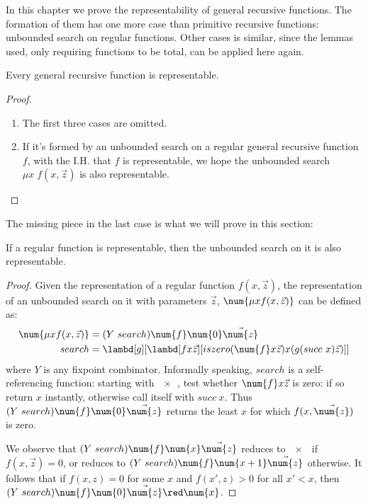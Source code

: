 \documentclass[../../../include/open-logic-section]{subfiles}
\begin{document}

In this chapter we prove the representability of general recursive
functions. The formation of them has one more case than primitive
recursive functions: unbounded search on regular functions. Other
cases is similar, since the lemmas used, only requiring functions to be
total, can be applied here again. 
\begin{prop}
  Every general recursive function is representable.
\end{prop}
\begin{proof}
  \begin{enumerate}
  \item The first three cases are omitted.
  \item If it's formed by an unbounded search on a regular general
    recursive function $f$, with the I.H. that $f$ is representable,
    we hope the unbounded search $\mu x \; f(x, \vec z)$ is also
    representable. 
  \end{enumerate}
\end{proof}

The missing piece in the last case is what we will prove in this
section:

\begin{lem}
  If a regular function is representable, then the unbounded search on
  it is also representable.
\end{lem}
\begin{proof}
  Given the representation of a regular function $f(x,\vec z)$, the
  representation of an unbounded search on it with parameters $\vec
  z$, $\num{\mu x  f(x,\vec z)}$ can be defined as:
  \begin{align*}
    \num{\mu x  f(x,\vec{z})} &= (Y ~ search) \num{f} \num{0}
                                 \vec{\num{z}} \\
    search &= \lambd[g][\lambd[fx \vec{z}][iszero (\num{f} x \vec{z}) x (g (succ ~ x)
             \vec{z})]]
  \end{align*}
  where $Y$ is any fixpoint combinator. Informally speaking, $search$ is
  a self-referencing function: starting with $\num{x}$, test whether $\num{f} x
  \vec z$ is zero: if so return $x$ instantly, otherwise call itself
  with $succ ~ x$. Thus $(Y ~ search) \num{f} \num{0} \vec{\num{z}}$ returns
  the least $x$ for which $f(x,\vec{\num{z}})$ is zero.
  
  We observe that $(Y ~ search) \num{f} \num{x} \vec{\num{z}}$ reduces to $\num{x}$ if
  $f(x,\vec z)=0$, or reduces to $(Y ~ search) \num{f} \num{x+1} \vec{\num{z}}$
  otherwise. It follows that if $f(x,z) = 0$ for some $x$ and $f(x',z) > 0$ for all $x' < x$,
  then $(Y ~ search) \num{f} \num{0} \vec{\num{z}} \red \num{x}$.
\end{proof}
\end{document}
